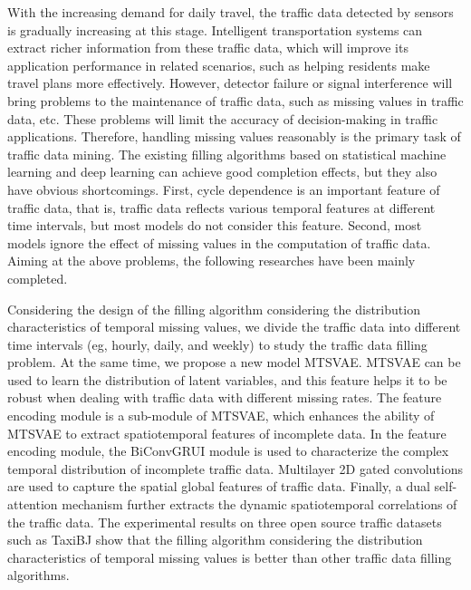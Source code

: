 \begin{eabstract}
With the increasing demand for daily travel, the traffic data detected by sensors is gradually increasing at this stage. Intelligent transportation systems can extract richer information from these traffic data, which will improve its application performance in related scenarios, such as helping residents make travel plans more effectively. However, detector failure or signal interference will bring problems to the maintenance of traffic data, such as missing values ​​in traffic data, etc. These problems will limit the accuracy of decision-making in traffic applications. Therefore, handling missing values ​​reasonably is the primary task of traffic data mining. The existing filling algorithms based on statistical machine learning and deep learning can achieve good completion effects, but they also have obvious shortcomings. First, cycle dependence is an important feature of traffic data, that is, traffic data reflects various temporal features at different time intervals, but most models do not consider this feature. Second, most models ignore the effect of missing values ​​in the computation of traffic data. Aiming at the above problems, the following researches have been mainly completed.

Considering the design of the filling algorithm considering the distribution characteristics of temporal missing values, we divide the traffic data into different time intervals (eg, hourly, daily, and weekly) to study the traffic data filling problem. At the same time, we propose a new model MTSVAE. MTSVAE can be used to learn the distribution of latent variables, and this feature helps it to be robust when dealing with traffic data with different missing rates. The feature encoding module is a sub-module of MTSVAE, which enhances the ability of MTSVAE to extract spatiotemporal features of incomplete data. In the feature encoding module, the BiConvGRUI module is used to characterize the complex temporal distribution of incomplete traffic data. Multilayer 2D gated convolutions are used to capture the spatial global features of traffic data. Finally, a dual self-attention mechanism further extracts the dynamic spatiotemporal correlations of the traffic data. The experimental results on three open source traffic datasets such as TaxiBJ show that the filling algorithm considering the distribution characteristics of temporal missing values ​​is better than other traffic data filling algorithms.


\end{eabstract}
